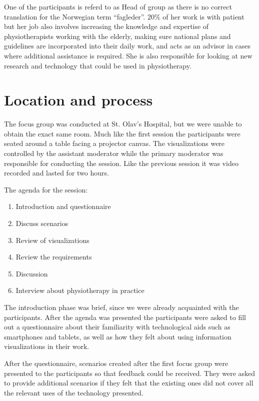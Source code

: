 One of the participants is referd to as Head of group as there is no correct translation for the Norwegian term ``fagleder''. 20\% of her work is with patient but her job also involves increasing the knowledge and expertise of physiotherapists working with the elderly, making sure national plans and guidelines are incorporated into their daily work, and acts as an advisor in cases where additional assistance is required. She is also responsible for looking at new research and technology that could be used in physiotherapy.

\section{Location and process}
The focus group was conducted at St. Olav's Hospital, but we were unable to obtain the exact same room.  Much like the first session the participants were seated around a table facing a projector canvas. The visualizations were controlled by the assistant moderator while the primary moderator was responsible for conducting the session. Like the previous session it was video recorded and lasted for two hours.

The agenda for the session:
\vspace{-6mm}
\begin{enumerate}[itemsep=0cm, parsep=0cm]
  \item Introduction and questionnaire
  \item Discuss scenarios
  \item Review of visualizations
  \item Review the requirements
  \item Discussion
  \item Interview about physiotherapy in practice
\end{enumerate}

The introduction phase was brief, since we were already acquainted with the participants. After the agenda was presented the participants were asked to fill out a questionnaire about their familiarity with technological aids such as smartphones and tablets, as well as how they felt about using information visualizations in their work. 

After the questionnaire, scenarios created after the first focus group were presented to the participants so that feedback could be received. They were asked to provide additional scenarios if they felt that the existing ones did not cover all the relevant uses of the technology presented.

